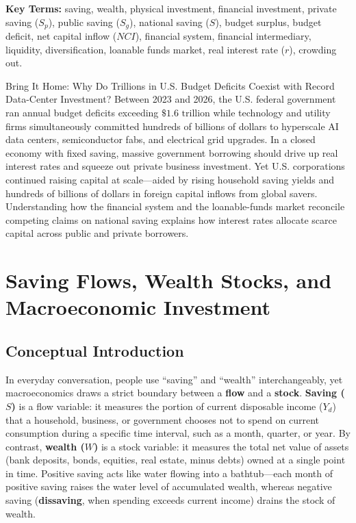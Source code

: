 \documentclass[11pt,letterpaper]{article}
\begin{document}
\noindent\textbf{Key Terms:} saving, wealth, physical investment, financial investment, private saving ($S_p$), public saving ($S_g$), national saving ($S$), budget surplus, budget deficit, net capital inflow ($NCI$), financial system, financial intermediary, liquidity, diversification, loanable funds market, real interest rate ($r$), crowding out.

\begin{examplecase}{Bring It Home: Why Do Trillions in U.S. Budget Deficits Coexist with Record Data-Center Investment?}
Between 2023 and 2026, the U.S. federal government ran annual budget deficits exceeding $\$1.6\text{ trillion}$ while technology and utility firms simultaneously committed hundreds of billions of dollars to hyperscale AI data centers, semiconductor fabs, and electrical grid upgrades. In a closed economy with fixed saving, massive government borrowing should drive up real interest rates and squeeze out private business investment. Yet U.S. corporations continued raising capital at scale—aided by rising household saving yields and hundreds of billions of dollars in foreign capital inflows from global savers. Understanding how the financial system and the loanable-funds market reconcile competing claims on national saving explains how interest rates allocate scarce capital across public and private borrowers.
\end{examplecase}

\section{Saving Flows, Wealth Stocks, and Macroeconomic Investment}

\subsection*{Conceptual Introduction}
\label{sec:saving-flow-wealth-stock}
In everyday conversation, people use ``saving'' and ``wealth'' interchangeably, yet macroeconomics draws a strict boundary between a \textbf{flow} and a \textbf{stock}. \textbf{Saving ($S$)} is a flow variable: it measures the portion of current disposable income ($Y_d$) that a household, business, or government chooses not to spend on current consumption during a specific time interval, such as a month, quarter, or year. By contrast, \textbf{wealth ($W$)} is a stock variable: it measures the total net value of assets (bank deposits, bonds, equities, real estate, minus debts) owned at a single point in time. Positive saving acts like water flowing into a bathtub—each month of positive saving raises the water level of accumulated wealth, whereas negative saving (\textbf{dissaving}, when spending exceeds current income) drains the stock of wealth.
\end{document}
